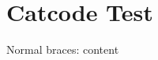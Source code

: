 \documentclass{article}
\begin{document}
\section{Catcode Test}
Normal braces: {content}
\end{document}
